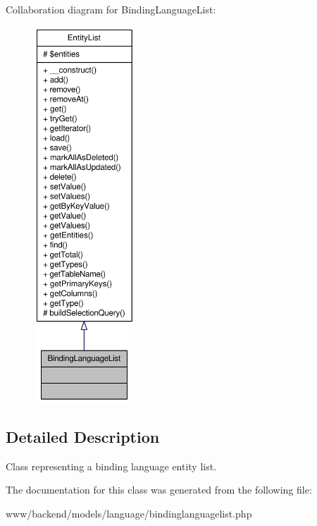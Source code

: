 Collaboration diagram for BindingLanguageList:\nopagebreak
\begin{figure}[H]
\begin{center}
\leavevmode
\includegraphics[height=400pt]{classBindingLanguageList__coll__graph}
\end{center}
\end{figure}


\subsection{Detailed Description}
Class representing a binding language entity list. 

The documentation for this class was generated from the following file:\begin{DoxyCompactItemize}
\item 
www/backend/models/language/bindinglanguagelist.php\end{DoxyCompactItemize}
